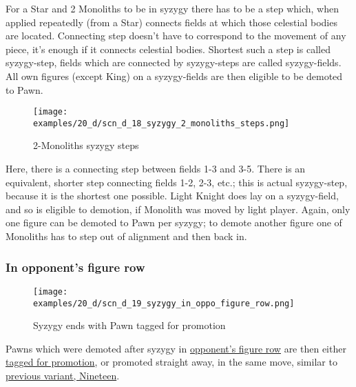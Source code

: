 For a Star and 2 Monoliths to be in syzygy there has to be a step which, when applied repeatedly (from a Star)
connects fields at which those celestial bodies are located. Connecting step doesn't have to correspond to the
movement of any piece, it's enough if it connects celestial bodies. Shortest such a step is called syzygy-step,
fields which are connected by syzygy-steps are called syzygy-fields. All own figures (except King) on a
syzygy-fields are then eligible to be demoted to Pawn.

\clearpage %

\noindent
\begin{figure}[!h]
\texttt{[image: examples/20\_d/scn\_d\_18\_syzygy\_2\_monoliths\_steps.png]}
\caption{2-Monoliths syzygy steps}
\label{fig:scn_d_18_syzygy_2_monoliths_steps}
\end{figure}

Here, there is a connecting step between fields 1-3 and 3-5. There is an equivalent, shorter step connecting fields
1-2, 2-3, etc.; this is actual syzygy-step, because it is the shortest one possible. Light Knight does lay on a
syzygy-field, and so is eligible to demotion, if Monolith was moved by light player. Again, only one figure can be
demoted to Pawn per syzygy; to demote another figure one of Monoliths has to step out of alignment and then back in.

\clearpage %

\subsubsection*{In opponent's figure row}

\vspace*{-1.2\baselineskip}
\noindent
\begin{figure}[!h]
\texttt{[image: examples/20\_d/scn\_d\_19\_syzygy\_in\_oppo\_figure\_row.png]}
\caption{Syzygy ends with Pawn tagged for promotion}
\label{fig:scn_d_19_syzygy_in_oppo_figure_row}
\end{figure}

Pawns which were demoted after syzygy in
\hyperref[fig:scn_aoa_14_pawn_figure_piece_rush_rows]{opponent's figure row}
are then either \hyperref[sec:Age of Aquarius/Promotion]{tagged for promotion},
or promoted straight away, in the same move, similar to
\hyperref[fig:scn_n_11_teleport_pawns_init]{previous variant, Nineteen}.

